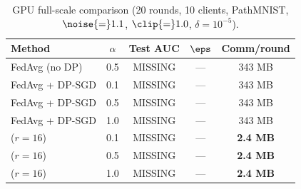 \begin{table}[h]
\centering
\caption{GPU full-scale comparison (20 rounds, 10 clients, PathMNIST, $\noise{=}1.1$, $\clip{=}1.0$, $\delta{=}10^{-5}$).}
\label{tab:gpu}
\begin{tabular}{lcccc}
\toprule
Method & $\alpha$ & Test AUC & $\eps$ & Comm/round \\
\midrule
FedAvg (no DP) & 0.5 & {\color{red}MISSING} & --- & 343 MB \\
FedAvg + DP-SGD & 0.1 & {\color{red}MISSING} & --- & 343 MB \\
FedAvg + DP-SGD & 0.5 & {\color{red}MISSING} & --- & 343 MB \\
FedAvg + DP-SGD & 1.0 & {\color{red}MISSING} & --- & 343 MB \\
\method{} ($r{=}16$) & 0.1 & {\color{red}MISSING} & --- & \textbf{2.4 MB} \\
\method{} ($r{=}16$) & 0.5 & {\color{red}MISSING} & --- & \textbf{2.4 MB} \\
\method{} ($r{=}16$) & 1.0 & {\color{red}MISSING} & --- & \textbf{2.4 MB} \\
\bottomrule
\end{tabular}
\end{table}